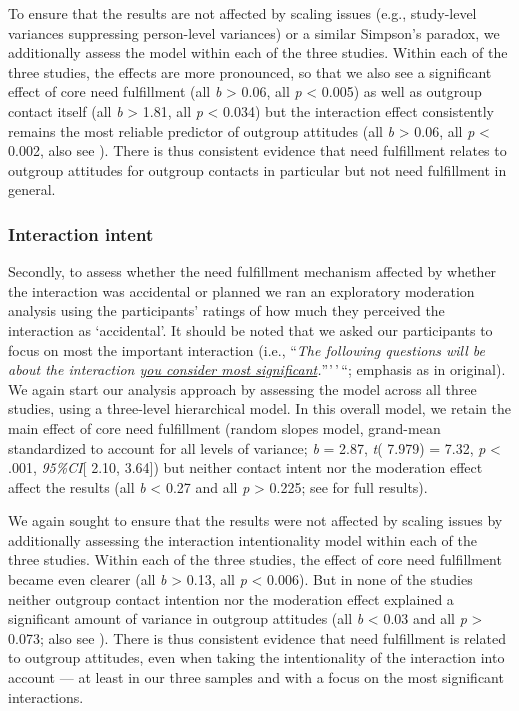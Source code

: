To ensure that the results are not affected by scaling issues (e.g.,
study-level variances suppressing person-level variances) or a similar
Simpson's paradox, we additionally assess the model within each of the
three studies. Within each of the three studies, the effects are more
pronounced, so that we also see a significant effect of core need
fulfillment (all \textit{b} \textgreater{} 0.06, all \textit{p}
\textless{} 0.005) as well as outgroup contact itself (all
\textbar{}\textit{b}\textbar{} \textgreater{} 1.81, all \textit{p}
\textless{} 0.034) but the interaction effect consistently remains the
most reliable predictor of outgroup attitudes (all
\textbar{}\textit{b}\textbar{} \textgreater{} 0.06, all \textit{p}
\textless{} 0.002, also see ). There is
thus consistent evidence that need fulfillment relates to outgroup
attitudes for outgroup contacts in particular but not need fulfillment
in general.

\subsubsection{Interaction intent}

Secondly, to assess whether the need fulfillment mechanism affected by
whether the interaction was accidental or planned we ran an exploratory
moderation analysis using the participants' ratings of how much they
perceived the interaction as `accidental'. It should be noted that we
asked our participants to focus on most the important interaction (i.e.,
``\textit{The following questions will be about the interaction \underline{you consider most significant}.}'''\,'\,``;
emphasis as in original). We again start our analysis approach by
assessing the model across all three studies, using a three-level
hierarchical model. In this overall model, we retain the main effect of
core need fulfillment (random slopes model, grand-mean standardized to
account for all levels of variance; \textit{b} = 2.87, \textit{t}(
7.979) = 7.32, \textit{p} \textless{} .001, \textit{95\%CI}{[} 2.10,
3.64{]}) but neither contact intent nor the moderation effect affect the
results (all \textbar{}\textit{b}\textbar{} \textless{} 0.27 and all
\textit{p} \textgreater{} 0.225; see  for
full results).

We again sought to ensure that the results were not affected by scaling
issues by additionally assessing the interaction intentionality model
within each of the three studies. Within each of the three studies, the
effect of core need fulfillment became even clearer (all
\textbar{}\textit{b}\textbar{} \textgreater{} 0.13, all \textit{p}
\textless{} 0.006). But in none of the studies neither outgroup contact
intention nor the moderation effect explained a significant amount of
variance in outgroup attitudes (all \textbar{}\textit{b}\textbar{}
\textless{} 0.03 and all \textit{p} \textgreater{} 0.073; also see
). There is thus consistent evidence that
need fulfillment is related to outgroup attitudes, even when taking the
intentionality of the interaction into account --- at least in our three
samples and with a focus on the most significant interactions.

